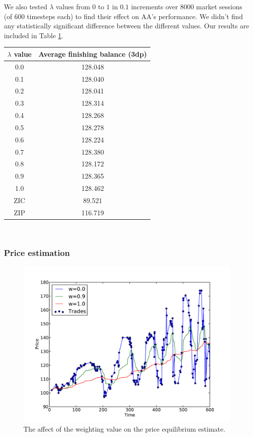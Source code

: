 \documentclass[preprint]{acm_proc_article-sp} %
\begin{document}
We also tested $\lambda$ values from $0$ to $1$ in $0.1$ increments over 8000
market sessions (of 600 timesteps each) to find their effect on AA's
performance. We didn't find any statistically significant difference between
the different values. Our results are included in Table
\ref{tbl:lambda_results}.
\begin{table}[h]
  \centering
  \label{tbl:lambda_results}
  \begin{tabular}{ | c | c | }
    \hline
    \textbf{$\lambda$ value} & \textbf{Average finishing balance (3dp)} \\
    \hline
    0.0 & 128.048 \\
    0.1 & 128.040 \\
    0.2 & 128.041 \\
    0.3 & 128.314 \\
    0.4 & 128.268 \\
    0.5 & 128.278 \\
    0.6 & 128.224 \\
    0.7 & 128.380 \\
    0.8 & 128.172 \\
    0.9 & 128.365 \\
    1.0 & 128.462 \\
    \hline \hline
    ZIC & 89.521 \\
    ZIP & 116.719 \\
    \hline
  \end{tabular}
\end{table}\\


\subsubsection{Price estimation} \label{sec:AA_price_estimation}
\begin{figure}
  \centering
  \label{fig:equilibrium}
  \includegraphics[width=\columnwidth]{graphs_and_stats/graph_equilibriums.pdf}
  \caption{The affect of the weighting value on the price equilibrium
  estimate.}
\end{figure}
\end{document}

